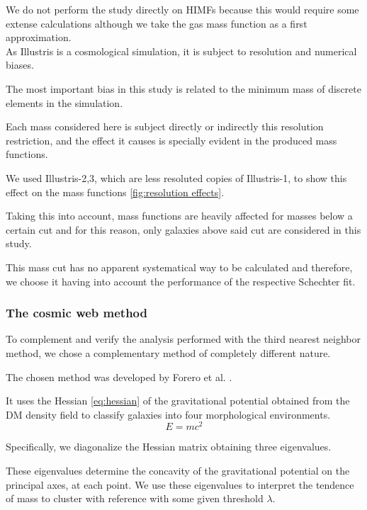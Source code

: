 \documentclass[a4paper,fleqn,usenatbib]{mnras}
\begin{document}
We do not perform the study directly on HIMFs because this would require some extense calculations although we take the gas mass function as a first approximation.\\

As Illustris is a cosmological simulation, it is subject to resolution and numerical biases.

The most important bias in this study is related to the minimum mass of discrete elements in the simulation.
 
Each mass considered here is subject directly or indirectly this resolution restriction, and the effect it causes is specially evident in the produced mass functions. 

We used Illustris-2,3, which are less resoluted copies of Illustris-1, to show this effect on the mass functions \ref{fig:resolution effects}. 

Taking this into account, mass functions are heavily affected for masses below a certain cut and for this reason, only galaxies above said cut are considered in this study.

This mass cut has no apparent systematical way to be calculated and therefore, we choose it having into account the performance of the respective Schechter fit.\\

\subsubsection{The cosmic web method}
To complement and verify the analysis performed with the third nearest neighbor method, we chose a complementary method of completely different nature. 

The chosen method was developed by Forero et al. \cite{forero1}. 

It uses the Hessian \ref{eq:hessian} of the gravitational potential obtained from the DM density field to classify galaxies into four morphological environments.\\  

\begin{equation}
E =  mc^2
\label{eq:hessian}
\end{equation}

Specifically, we diagonalize the Hessian matrix obtaining three eigenvalues. 

These eigenvalues determine the concavity of the gravitational potential on the principal axes, at each point. We use these eigenvalues to interpret the tendence of mass to cluster with reference with some given threshold $\lambda$. 
\end{document}
